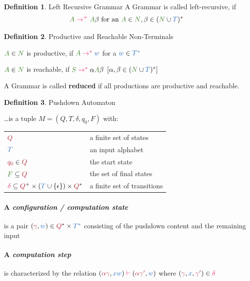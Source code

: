 \documentclass[10pt, landscape]{article}
\theoremstyle{definition}
\newtheorem{definition}{Definition}[section]
\newcommand{\Set}[1]{\textcolor{OliveGreen}{#1}}
\newcommand{\Op}[1]{\textcolor{WildStrawberry}{#1}}
\newcommand{\derives}[1][]{\Op{\;\rightarrow_{#1}^{*}\;}}
\newcommand{\derivep}[1][]{\Op{\;\rightarrow_{#1}^{+}\;}}
\newcommand{\nontermcolor}{OliveGreen}
\newcommand{\nt}[1]{\textcolor{\nontermcolor}{#1}}
\newcommand{\nonterms}{\nt{N}}
\newcommand{\ntA}{\nt{A}}
\newcommand{\ntS}{\nt{S}}
\newcommand{\termcolor}{NavyBlue}
\newcommand{\term}[1]{\textcolor{\termcolor}{#1}}
\newcommand{\terms}{\textcolor{\termcolor}{T}}
\newcommand{\termws}{\textcolor{\termcolor}{T^*}}
\newcommand{\termW}{\textcolor{\termcolor}{w}}
\newcommand{\termX}{\textcolor{\termcolor}{x}}
\newcommand{\grammarwords}{(\nonterms \cup \terms)^{*}}
\newcommand{\step}{\Op{\;\vdash\;}}
\newcommand{\trans}{%
  { \textcolor{WildStrawberry}{\delta} }
}
\newcommand{\statecolor}{Maroon}
\newcommand{\state}[1]{\textcolor{\statecolor}{#1}}
\newcommand{\states}{\textcolor{\statecolor}{Q}}
\newcommand{\stateQ}[1][]{\textcolor{\statecolor}{q_{#1}}}
\newcommand{\stateQZ}{\stateQ[0]}
\begin{document}
\begin{multicols*}{3}
\begin{definition}{Left Recursive Grammar}
  A Grammar is called left-recursive, if
  \[
    \ntA \derivep \ntA\beta \text{ for an } \ntA\in \nonterms, \beta \in \grammarwords
  \]

\end{definition}


\begin{definition}{Productive and Reachable Non-Terminals}

  $\ntA \in \nonterms$ is productive, if $\ntA \derives \termW$ for a $\termW \in \termws$

  $\ntA \in \nonterms$ is reachable, if $\ntS \derives \alpha \ntA \beta $ $[\alpha,\beta\in \grammarwords]$

  A Grammar is called \textbf{reduced} if all productions are productive and reachable.

\end{definition}


\begin{definition}{Pushdown Automaton}

  \dots is a tuple $M = (Q, T, \delta, q_{0}, F)$ with:
  \begin{center}
    \begin{tabular}{l l}
      $\states$                                                              & a finite set of states \\
      $\terms$                                                              & an input alphabet\\
      $\stateQZ \in \states$                                                     & the start state \\
      $\Set{F} \subseteq \states$                                                   & the set of final states \\
      $\trans \subseteq \states^{+} \times (\terms \cup \{\epsilon\}) \times \states^{*}$ & a finite set of transitions \\
    \end{tabular}
  \end{center}

  \paragraph{A \textit{configuration / computation state}} is a pair $(\state{\gamma}, \termW) \in \states^{*} \times \termws$ consisting of the pushdown content and the remaining input

  \paragraph{A \textit{computation step}} is characterized by the relation $(\state{\alpha\gamma}, \term{xw}) \step (\state{\alpha\gamma'}, \termW)$ where $(\state{\gamma}, \termX, \state{\gamma'}) \in \trans$


\end{definition}
\end{multicols*}
\end{document}
